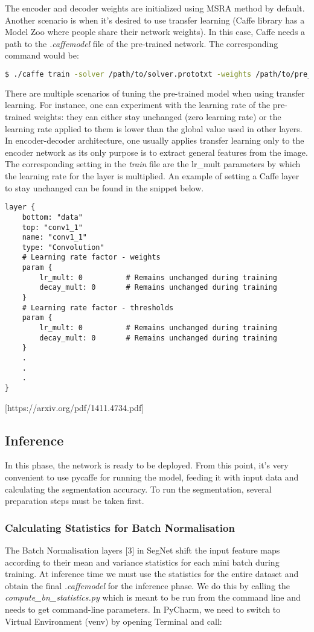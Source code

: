 The encoder and decoder weights are initialized using MSRA method by default. Another scenario is when it's desired to use transfer learning (Caffe library has a Model Zoo where people share their network weights). In this case, Caffe needs a path to the \textit{.caffemodel} file of the pre-trained network. The corresponding command would be:

\begin{lstlisting}[language=bash]
$ ./caffe train -solver /path/to/solver.prototxt -weights /path/to/pre_trained_weights.caffemodel
\end{lstlisting}

There are multiple scenarios of tuning the pre-trained model when using transfer learning. For instance, one can experiment with the learning rate of the pre-trained weights: they can either stay unchanged (zero learning rate) or the learning rate applied to them is lower than the global value used in other layers. In encoder-decoder architecture, one usually applies transfer learning only to the encoder network as its only purpose is to extract general features from the image. The corresponding setting in the \textit{train} file are the lr\_mult parameters by which the learning rate for the layer is multiplied. An example of setting a Caffe layer to stay unchanged can be found in the snippet below.

\begin{lstlisting}
layer {
	bottom: "data"
	top: "conv1_1"
	name: "conv1_1"
	type: "Convolution"
	# Learning rate factor - weights
	param {
		lr_mult: 0			# Remains unchanged during training
		decay_mult: 0		# Remains unchanged during training
	}
	# Learning rate factor - thresholds
	param {
		lr_mult: 0			# Remains unchanged during training
		decay_mult: 0		# Remains unchanged during training
	}
	.
	.
	.
}
\end{lstlisting}

 [https://arxiv.org/pdf/1411.4734.pdf]

\subsection{Inference}

In this phase, the network is ready to be deployed. From this point, it's very convenient to use pycaffe for running the model, feeding it with input data and calculating the segmentation accuracy. To run the segmentation, several preparation steps must be taken first.

\subsubsection{Calculating Statistics for Batch Normalisation}
The Batch Normalisation layers [3] in SegNet shift the input feature maps according to their mean and variance statistics for each mini batch during training. At inference time we must use the statistics for the entire dataset and obtain the final \textit{.caffemodel} for the inference phase. We do this by calling the \textit{compute\_bn\_statistics.py} which is meant to be run from the command line and needs to get command-line parameters. In PyCharm, we need to switch to Virtual Environment (venv) by opening Terminal and call:

